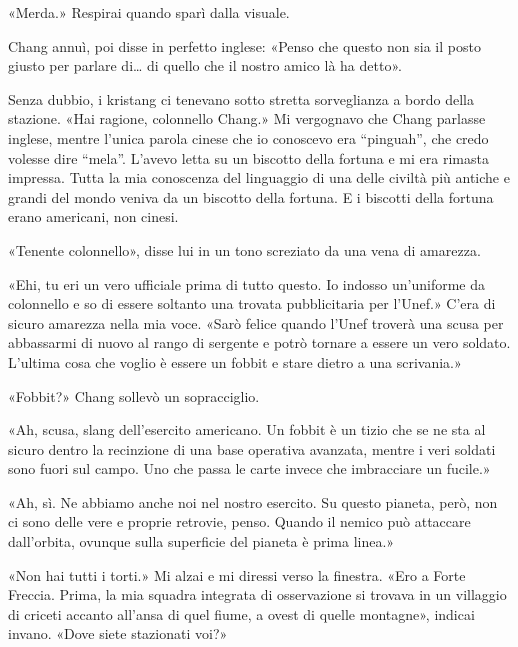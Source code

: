 «Merda.» Respirai quando sparì dalla visuale.

Chang annuì, poi disse in perfetto inglese: «Penso che questo non sia il
posto giusto per parlare di\ldots{} di quello che il nostro amico là ha
detto».

Senza dubbio, i kristang ci tenevano sotto stretta sorveglianza a bordo
della stazione. «Hai ragione, colonnello Chang.» Mi vergognavo che Chang
parlasse inglese, mentre l'unica parola cinese che io conoscevo era
``pinguah'', che credo volesse dire ``mela''. L'avevo letta su un
biscotto della fortuna e mi era rimasta impressa. Tutta la mia
conoscenza del linguaggio di una delle civiltà più antiche e grandi del
mondo veniva da un biscotto della fortuna. E i biscotti della fortuna
erano americani, non cinesi.

«Tenente colonnello», disse lui in un tono screziato da una vena di
amarezza.

«Ehi, tu eri un vero ufficiale prima di tutto questo. Io indosso
un'uniforme da colonnello e so di essere soltanto una trovata
pubblicitaria per l'Unef.» C'era di sicuro amarezza nella mia voce.
«Sarò felice quando l'Unef troverà una scusa per abbassarmi di nuovo al
rango di sergente e potrò tornare a essere un vero soldato. L'ultima
cosa che voglio è essere un fobbit e stare dietro a una scrivania.»

«Fobbit?» Chang sollevò un sopracciglio.

«Ah, scusa, slang dell'esercito americano. Un fobbit è un tizio che se
ne sta al sicuro dentro la recinzione di una base operativa avanzata,
mentre i veri soldati sono fuori sul campo. Uno che passa le carte
invece che imbracciare un fucile.»

«Ah, sì. Ne abbiamo anche noi nel nostro esercito. Su questo pianeta,
però, non ci sono delle vere e proprie retrovie, penso. Quando il nemico
può attaccare dall'orbita, ovunque sulla superficie del pianeta è prima
linea.»

«Non hai tutti i torti.» Mi alzai e mi diressi verso la finestra. «Ero a
Forte Freccia. Prima, la mia squadra integrata di osservazione si
trovava in un villaggio di criceti accanto all'ansa di quel fiume, a
ovest di quelle montagne», indicai invano. «Dove siete stazionati voi?»

